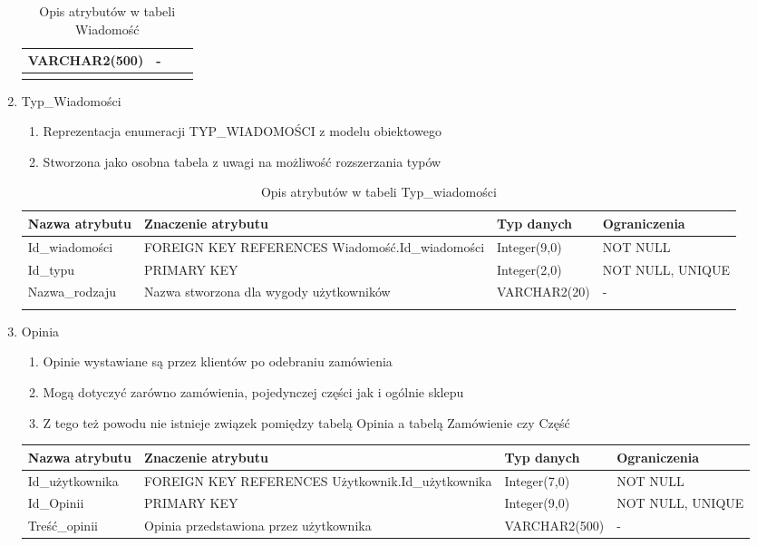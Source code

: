 \begin{enumerate}
{\begin{longtable}{|p{3cm}|p{5cm}|p{2.5cm}|p{2.5cm}|}
  	VARCHAR2(500) & -
  	\\
  	\hline
	\caption{Opis atrybutów w tabeli Wiadomość}
	\end{longtable}}
  \item Typ\_Wiadomości
  	\begin{enumerate}
  	  \item Reprezentacja enumeracji TYP\_WIADOMOŚCI z modelu obiektowego
  	  \item Stworzona jako osobna tabela z uwagi na możliwość rozszerzania typów 
  	\end{enumerate}
  	{\footnotesize
  	\begin{longtable}{|p{3cm}|p{5cm}|p{2.5cm}|p{2.5cm}|}
  	\hline
  	\textbf{Nazwa atrybutu} & \textbf{Znaczenie atrybutu} & \textbf{Typ danych} &
  	\textbf{Ograniczenia} \\
  	\hline
  	Id\_wiadomości & FOREIGN KEY REFERENCES Wiadomość.Id\_wiadomości  &
  	Integer(9,0) & NOT NULL
  	\\
  	\hline
  	Id\_typu & PRIMARY KEY & Integer(2,0) & NOT NULL, UNIQUE  \\
  	\hline
  	Nazwa\_rodzaju & Nazwa stworzona dla wygody użytkowników & VARCHAR2(20) &
  	-
  	\\
  	\hline
	\caption{Opis atrybutów w tabeli Typ\_wiadomości}
	\end{longtable}}
  \item Opinia
  	\begin{enumerate}
  	  \item Opinie wystawiane są przez klientów po odebraniu zamówienia
  	  \item Mogą dotyczyć zarówno zamówienia, pojedynczej części jak i ogólnie
  	  sklepu
  	  \item Z tego też powodu nie istnieje związek pomiędzy tabelą Opinia a
  	  tabelą Zamówienie czy Część
  	\end{enumerate}
  	{\footnotesize
  	\begin{longtable}{|p{3cm}|p{5cm}|p{2.5cm}|p{2.5cm}|}
  	\hline
  	\textbf{Nazwa atrybutu} & \textbf{Znaczenie atrybutu} & \textbf{Typ danych} &
  	\textbf{Ograniczenia} \\
  	\hline
  	Id\_użytkownika & FOREIGN KEY REFERENCES Użytkownik.Id\_użytkownika &
  	Integer(7,0) & NOT NULL
  	\\
  	\hline
  	Id\_Opinii & PRIMARY KEY & Integer(9,0) & NOT NULL, UNIQUE  \\
  	\hline
  	Treść\_opinii & Opinia przedstawiona przez użytkownika & VARCHAR2(500) & - \\

\end{longtable}}
\end{enumerate}
